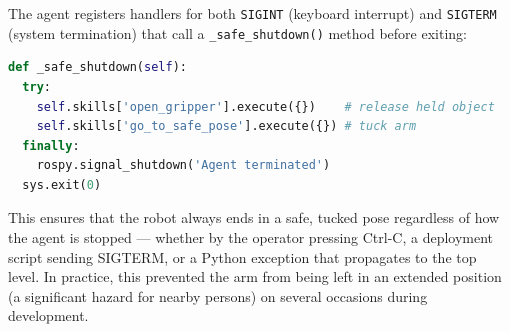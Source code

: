 The agent registers handlers for both \texttt{SIGINT} (keyboard interrupt) and
\texttt{SIGTERM} (system termination) that call a
\texttt{\_safe\_shutdown()} method before exiting:

\begin{lstlisting}[language=Python, numbers=none,
    caption={Signal handler for safe shutdown.}]
def _safe_shutdown(self):
  try:
    self.skills['open_gripper'].execute({})    # release held object
    self.skills['go_to_safe_pose'].execute({}) # tuck arm
  finally:
    rospy.signal_shutdown('Agent terminated')
  sys.exit(0)
\end{lstlisting}

This ensures that the robot always ends in a safe, tucked pose regardless
of how the agent is stopped --- whether by the operator pressing Ctrl-C,
a deployment script sending SIGTERM, or a Python exception that propagates
to the top level.
In practice, this prevented the arm from being left in an extended position
(a significant hazard for nearby persons) on several occasions during
development.
